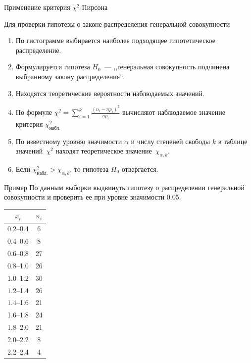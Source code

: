 \documentclass[unicode,11pt,notheorems,xcolor=table]{beamer}
\begin{document}
\begin{frame}{Применение критерия $\chi^2$ Пирсона}{}

Для проверки гипотезы о законе распределения генеральной совокупности
\begin{enumerate}
    \item По гистограмме выбирается наиболее подходящее гипотетическое распределение.

    \item  Формулируется гипотеза $H_0$~--- ,,генеральная совокупность подчинена выбранному закону распределения``.
    
    \item Находятся теоретические вероятности наблюдаемых значений.
    \item По формуле  $ \chi^2 = \sum_{i=1}^{k} \frac{(n_i-np_i)^2}{np_i}$ вычисляют наблюдаемое значение критерия $\chi^2_\text{набл.}$
    \item По известному уровню значимости $\alpha$  и числу степеней свободы $k$ в таблице значений~$\chi^2$ находят теоретическое значение~$\chi_{\alpha,k}$.
    \item Если $\chi^2_\text{набл.} > \chi_{\alpha,k}$, то гипотеза $H_0$ отвергается.
\end{enumerate}
\end{frame}


 \begin{frame}{Пример}{}
    По данным выборки выдвинуть гипотезу о распределении генеральной совокупности и  проверить ее при уровне значимости 0.05.
    \begin{tabular}{cc}
    $x_i $     &  $n_i$\\
    \hline
    0.2--0.4   & 6  \\
    0.4--0.6   & 8  \\
    0.6--0.8   & 27 \\
    0.8--1.0   & 26 \\
    1.0--1.2   & 30 \\
    1.2--1.4   & 26 \\
    1.4--1.6   & 21 \\
    1.6--1.8   & 24 \\
    1.8--2.0   & 21 \\
    2.0--2.2   & 8  \\
    2.2--2.4   & 4  \\
    \hline
    \end{tabular}
\end{frame}
\end{document}
